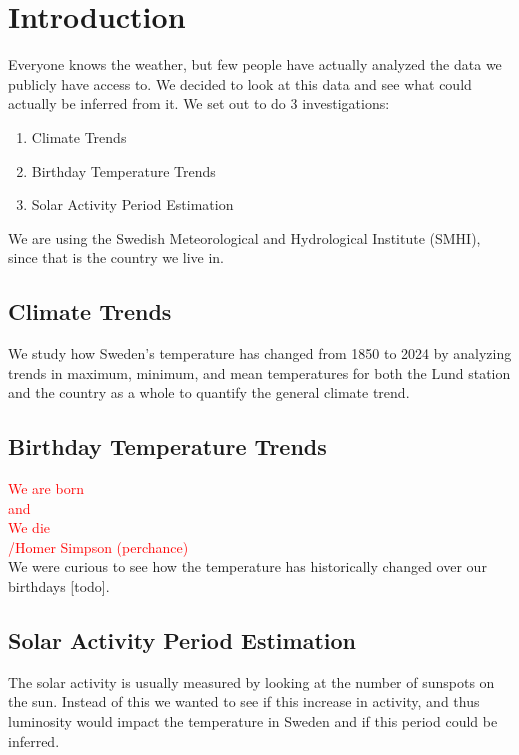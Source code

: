 

\section{Introduction}

Everyone knows the weather, but few people have actually analyzed the data we publicly have access to. We decided to look at this data and see what could actually be inferred from it. We set out to do 3 investigations:
\begin{enumerate}
    \item Climate Trends
    \item Birthday Temperature Trends
    \item Solar Activity Period Estimation
\end{enumerate}

We are using the Swedish Meteorological and Hydrological Institute (SMHI), since that is the country we live in.

\subsection{Climate Trends}
We study how Sweden’s temperature has changed from 1850 to 2024 by analyzing trends in maximum, minimum, and mean temperatures for both the Lund station and the country as a whole to quantify the general climate trend.

\subsection{Birthday Temperature Trends}


{\Huge \textcolor{red}{We are born \\ and \\ We die}}\\\textcolor{red}{/Homer Simpson (perchance)}\\

We were curious to see how the temperature has historically changed over our birthdays [todo].

\subsection{Solar Activity Period Estimation}
The solar activity is usually measured by looking at the number of sunspots on the sun. Instead of this we wanted to see if this increase in activity, and thus luminosity would impact the temperature in Sweden and if this period could be inferred.






